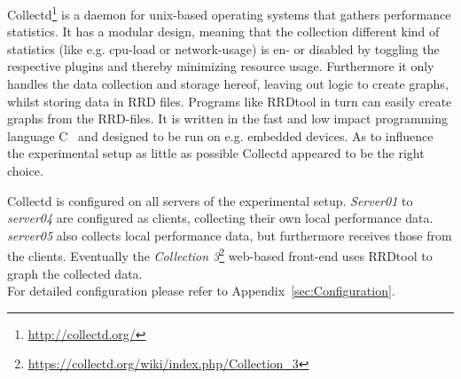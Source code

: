Collectd\footnote{\url{http://collectd.org/}} is a daemon for unix-based operating systems that gathers performance statistics. It has a modular design, meaning that the collection different kind of statistics (like e.g. cpu-load or network-usage) is en- or disabled by toggling the respective plugins and thereby minimizing resource usage. Furthermore it only handles the data collection and storage hereof, leaving out logic to create graphs, whilst storing data in \ac{RRD} files. Programs like RRDtool in turn can easily create graphs from the RRD-files. It is written in the fast and low impact programming language C~\cite{prechelt2000empirical} and designed to be run on e.g. embedded devices.
As to influence the experimental setup as little as possible Collectd appeared to be the right choice.

Collectd is configured on all servers of the experimental setup. \emph{Server01} to \emph{server04} are configured as clients, collecting their own local performance data. \emph{server05} also collects local performance data, but furthermore receives those from the clients. Eventually the \emph{Collection 3}\footnote{\url{https://collectd.org/wiki/index.php/Collection_3}} web-based front-end uses RRDtool to graph the collected data.
\\
For detailed configuration please refer to Appendix~\ref{sec:Configuration}.
